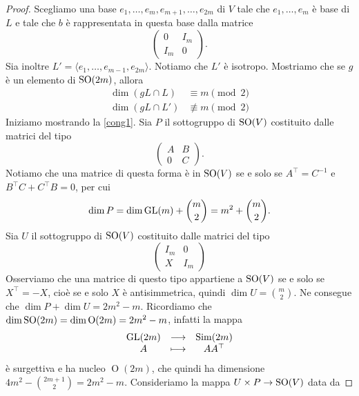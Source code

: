 \begin{proof}
Scegliamo una base $e_1,\ldots,e_m,e_{m+1},\ldots,e_{2m}$ di $V$ tale che $e_1,\ldots,e_m$ è base di $L$ e tale che $b$ è rappresentata in questa base dalla matrice 
\[\begin{pmatrix}
    0 & I_m \\ I_m & 0
\end{pmatrix}.\] 
Sia inoltre $L'=\langle e_1,\ldots,e_{m-1},e_{2m}\rangle$. Notiamo che $L'$ è isotropo. Mostriamo che se $g$ è un elemento di $\operatorname{SO}(2m)$, allora 
\begin{align}
    \label{cong1}\dim(gL\cap L)&\equiv m \pmod{2} \\
    \label{cong2}\dim(gL\cap L')&\not\equiv m \pmod{2}
\end{align}
Iniziamo mostrando la \eqref{cong1}. Sia $P$ il sottogruppo di $\operatorname{SO}(V)$ costituito dalle matrici del tipo 
\[\begin{pmatrix}
    A & B \\ 0 & C
\end{pmatrix}.\] 
Notiamo che una matrice di questa forma è in $\operatorname{SO}(V)$ se e solo se $A^\top=C^{-1}$ e $B^\top C+C^\top B=0$, per cui
\[\dim P= \dim \mathrm{GL}(m)+\binom{m}{2}=m^2+\binom{m}{2}.\] 
Sia $U$ il sottogruppo di $\operatorname{SO}(V)$ costituito dalle matrici del tipo \[\begin{pmatrix}
    I_m & 0 \\ X& I_m 
\end{pmatrix}\]
Osserviamo che una matrice di questo tipo appartiene a $\operatorname{SO}(V)$ se e solo se $X^\top=-X$, cioè se e solo $X$ è antisimmetrica, quindi $\dim U=\binom{m}{2}$. Ne consegue che $\dim P +\dim U= 2m^2-m$. Ricordiamo che $\dim \operatorname{SO}(2m)=\dim \operatorname{O}(2m)=2m^2-m$, infatti la mappa 
\[\begin{array}{ccc}
    \mathrm{GL}(2m)& \longrightarrow & \operatorname{Sim}(2m) \\
     A&\longmapsto& AA^\top
\end{array}\] 
è surgettiva e ha nucleo $\operatorname{O}(2m)$, che quindi ha dimensione $4m^2-\binom{2m+1}{2}=2m^2-m$. Consideriamo la mappa $U\times P \to \operatorname{SO}(V)$ data da



\end{proof}
